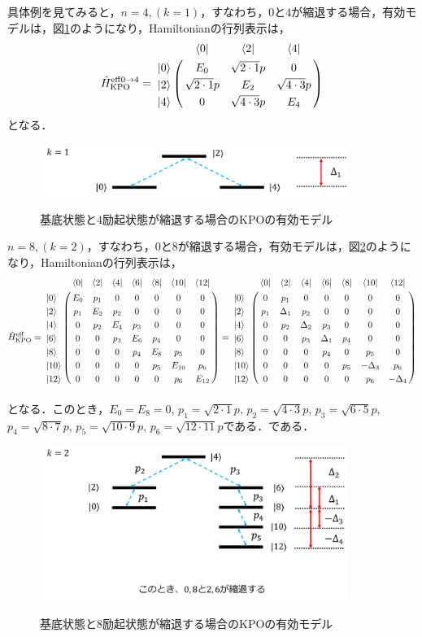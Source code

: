 具体例を見てみると，$n=4, (k=1)$，すなわち，$0$と$4$が縮退する場合，有効モデルは，図\ref{fig:kpo_effective_model_0_4}のようになり，Hamiltonianの行列表示は，
\begin{align}
     \hat{H}_{\rm{KPO}}^{\rm{eff} {0\to4}}=
   \bordermatrix{     
    & \bra{0} &  \bra{2} &  \bra{4}\cr
   \ket{0}&E_0&\sqrt{2\cdot1}p&0\cr
  \ket{2}&\sqrt{2\cdot1}p&E_2&\sqrt{4\cdot3}p\cr
  \ket{4}&0&\sqrt{4\cdot3}p&E_4\cr
            }
\end{align}
となる．
\begin{figure}[h]
\centering
		\includegraphics[width=10cm]{file/fig/effective_model/kpo_effective_model_0_4.png}\\
\caption{基底状態と$4$励起状態が縮退する場合のKPOの有効モデル}
\label{fig:kpo_effective_model_0_4}
\end{figure}

$n=8, (k=2)$，すなわち，$0$と$8$が縮退する場合，有効モデルは，図\ref{fig:kpo_effective_model_0_8}のようになり，Hamiltonianの行列表示は，
\begin{align}
     \hat{H}_{\rm{KPO}}^{\rm{eff}}&=
   \bordermatrix{     
    & \bra{0} &  \bra{2} &  \bra{4}&  \bra{6}&  \bra{8} &\bra{10} &\bra{12}\cr
   \ket{0}&E_0&p_1&0&0&0&0&0\cr
  \ket{2}&p_1&E_2&p_2&0&0&0&0\cr
  \ket{4}&0&p_2&E_4&p_3&0&0&0\cr
  \ket{6}&0&0&p_3&E_6&p_4&0&0\cr
  \ket{8}&0&0&0&p_4&E_8&p_5&0\cr
  \ket{10}&0&0&0&0&p_5&E_{10}&p_6\cr
  \ket{12}&0&0&0&0&0&p_6&E_{12}\cr
            }
    =
   \bordermatrix{     
    & \bra{0} &  \bra{2} &  \bra{4}&  \bra{6}&  \bra{8} &\bra{10} &\bra{12}\cr
   \ket{0}&0&p_1&0&0&0&0&0\cr
  \ket{2}&p_1&\Delta_1&p_2&0&0&0&0\cr
  \ket{4}&0&p_2&\Delta_2&p_3&0&0&0\cr
  \ket{6}&0&0&p_3&\Delta_1&p_4&0&0\cr
  \ket{8}&0&0&0&p_4&0&p_5&0\cr
  \ket{10}&0&0&0&0&p_5&-\Delta_3&p_6\cr
  \ket{12}&0&0&0&0&0&p_6&-\Delta_4\cr
            }\nn[10pt]
\end{align}
となる．このとき，$E_0=E_8=0$, $p_1=\sqrt{2\cdot1}p$, $p_2=\sqrt{4\cdot3}p$, $p_3=\sqrt{6\cdot5}p$, $p_4=\sqrt{8\cdot7}p$, $p_5=\sqrt{10\cdot9}p$, $p_6=\sqrt{12\cdot11}p$である．である．
\begin{figure}[h]
\centering
		\includegraphics[width=10cm]{file/fig/effective_model/kpo_effective_model_0_8.png}\\
\caption{基底状態と$8$励起状態が縮退する場合のKPOの有効モデル}
\label{fig:kpo_effective_model_0_8}
\end{figure}